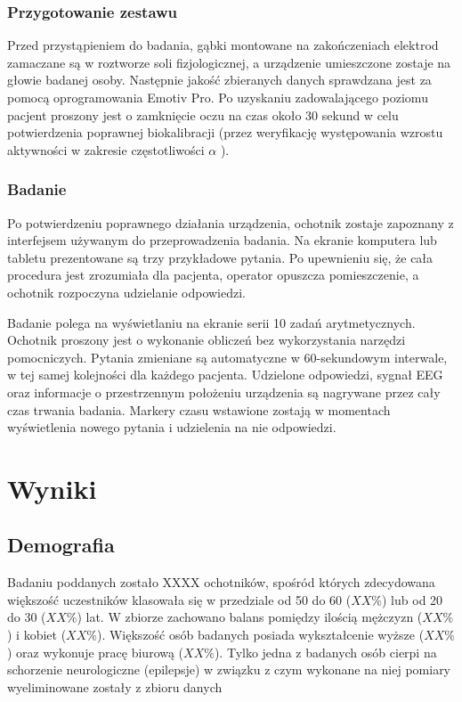 \documentclass{./assets/wfis}
\begin{document}
\subsection{Przygotowanie zestawu}
Przed przystąpieniem do badania, gąbki montowane na zakończeniach elektrod zamaczane są w roztworze soli fizjologicznej, a urządzenie umieszczone zostaje na głowie badanej osoby. Następnie jakość zbieranych danych sprawdzana jest za pomocą oprogramowania Emotiv Pro\cite{emotiv_inc_epoc_nodate}. Po uzyskaniu zadowalającego poziomu pacjent proszony jest o zamknięcie oczu na czas około 30 sekund w celu potwierdzenia poprawnej biokalibracji (przez weryfikację występowania wzrostu aktywności w zakresie częstotliwości $\alpha$ \cite{britton_electroencephalography_2016}).

\subsection{Badanie}
Po potwierdzeniu poprawnego działania urządzenia, ochotnik zostaje zapoznany z interfejsem używanym do przeprowadzenia badania. Na ekranie komputera lub tabletu prezentowane są trzy przykładowe pytania. Po upewnieniu się, że cała procedura jest zrozumiała dla pacjenta, operator opuszcza pomieszczenie, a ochotnik rozpoczyna udzielanie odpowiedzi.

Badanie polega na wyświetlaniu na ekranie  serii 10 zadań arytmetycznych. Ochotnik proszony jest o wykonanie obliczeń bez wykorzystania narzędzi pomocniczych. Pytania zmieniane są automatyczne w 60-sekundowym interwale, w tej samej kolejności dla każdego pacjenta. Udzielone odpowiedzi, sygnał EEG oraz informacje o przestrzennym położeniu urządzenia są nagrywane przez cały czas trwania badania. Markery czasu wstawione zostają w momentach wyświetlenia nowego pytania i udzielenia na nie odpowiedzi.


\chapter{Wyniki}
\section{Demografia}
Badaniu poddanych zostało XXXX ochotników, spośród których zdecydowana większość uczestników klasowała się w przedziale od 50 do 60 ($XX\%$) lub od 20 do 30 ($XX\%$) lat. W zbiorze zachowano balans pomiędzy ilością mężczyzn ($XX\%$) i kobiet ($XX\%$). Większość osób badanych posiada wykształcenie wyższe ($XX\%$) oraz wykonuje pracę biurową ($XX\%$). Tylko jedna z badanych osób cierpi na schorzenie neurologiczne (epilepsje) w związku z czym wykonane na niej pomiary  wyeliminowane zostały z zbioru danych
\end{document}

